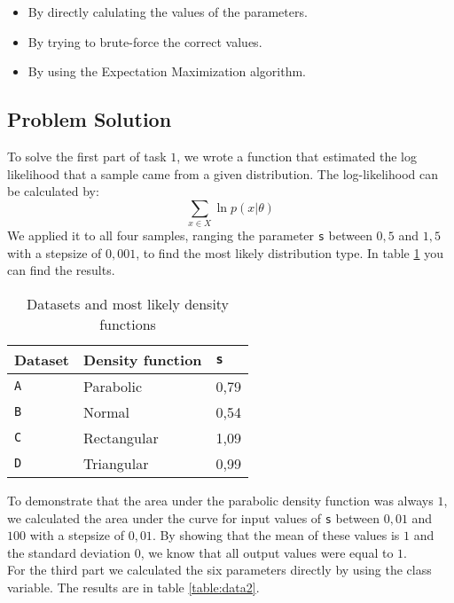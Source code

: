 \documentclass{article}
\begin{document}
\begin{itemize}
\item By directly calulating the values of the parameters.
\item By trying to brute-force the correct values.
\item By using the Expectation Maximization algorithm.
\end{itemize} 
\newpage
\subsection{Problem Solution}
To solve the first part of task $1$, we wrote a function that estimated the log likelihood that a sample came from a given distribution. 
The log-likelihood can be calculated by:\\
\[\sum_{x \in X} \ln {p(x|\theta)}\]
We applied it to all four samples, ranging the parameter \verb+s+ between $0,5$ and $1,5$ with a stepsize of $0,001$, to find the most likely distribution type. In table \ref{table:data1} you can find the results. \\

\begin{table}[H]
	\begin{center}
		\begin{tabular}{l|l|l}
			Dataset & Density function & \verb+s+ \\
			\hline
			\verb+A+ & Parabolic   & 0,79  \\
			\verb+B+ & Normal  & 0,54 \\
			\verb+C+ & Rectangular   & 1,09   \\
			\verb+D+ & Triangular   & 0,99   \\
		\end{tabular}
		\caption{Datasets and most likely density functions}
		\label{table:data1}
	\end{center}
\end{table}

To demonstrate that the area under the parabolic density function was always $1$, we calculated the area under the curve for input values of \verb+s+ between $0,01$ and $100$ with a stepsize of $0,01$. By showing that the mean of these values is $1$ and the standard deviation $0$, we know that all output values were equal to $1$.\\

For the third part we calculated the six parameters directly by using the class variable. The results are in table \ref{table:data2}. \\\\
\end{document}
